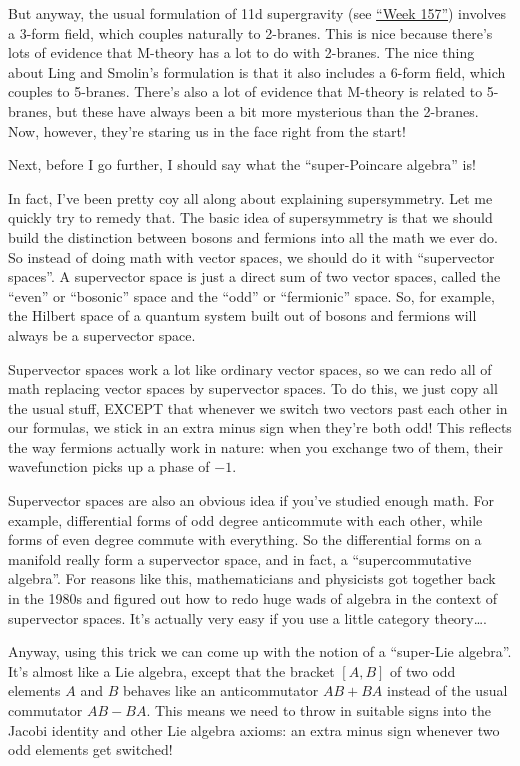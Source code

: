 \documentclass{article}
\begin{document}
But anyway, the usual formulation of 11d supergravity (see
\protect\hyperlink{week157}{``Week 157''}) involves a 3-form field,
which couples naturally to 2-branes. This is nice because there's lots
of evidence that M-theory has a lot to do with 2-branes. The nice thing
about Ling and Smolin's formulation is that it also includes a 6-form
field, which couples to 5-branes. There's also a lot of evidence that
M-theory is related to 5-branes, but these have always been a bit more
mysterious than the 2-branes. Now, however, they're staring us in the
face right from the start!

Next, before I go further, I should say what the ``super-Poincare
algebra'' is!

In fact, I've been pretty coy all along about explaining supersymmetry.
Let me quickly try to remedy that. The basic idea of supersymmetry is
that we should build the distinction between bosons and fermions into
all the math we ever do. So instead of doing math with vector spaces, we
should do it with ``supervector spaces''. A supervector space is just a
direct sum of two vector spaces, called the ``even'' or ``bosonic''
space and the ``odd'' or ``fermionic'' space. So, for example, the
Hilbert space of a quantum system built out of bosons and fermions will
always be a supervector space.

Supervector spaces work a lot like ordinary vector spaces, so we can
redo all of math replacing vector spaces by supervector spaces. To do
this, we just copy all the usual stuff, EXCEPT that whenever we switch
two vectors past each other in our formulas, we stick in an extra minus
sign when they're both odd! This reflects the way fermions actually work
in nature: when you exchange two of them, their wavefunction picks up a
phase of \(-1\).

Supervector spaces are also an obvious idea if you've studied enough
math. For example, differential forms of odd degree anticommute with
each other, while forms of even degree commute with everything. So the
differential forms on a manifold really form a supervector space, and in
fact, a ``supercommutative algebra''. For reasons like this,
mathematicians and physicists got together back in the 1980s and figured
out how to redo huge wads of algebra in the context of supervector
spaces. It's actually very easy if you use a little category
theory\ldots.

Anyway, using this trick we can come up with the notion of a ``super-Lie
algebra''. It's almost like a Lie algebra, except that the bracket
\([A,B]\) of two odd elements \(A\) and \(B\) behaves like an
anticommutator \(AB+BA\) instead of the usual commutator \(AB-BA\). This
means we need to throw in suitable signs into the Jacobi identity and
other Lie algebra axioms: an extra minus sign whenever two odd elements
get switched!
\end{document}
